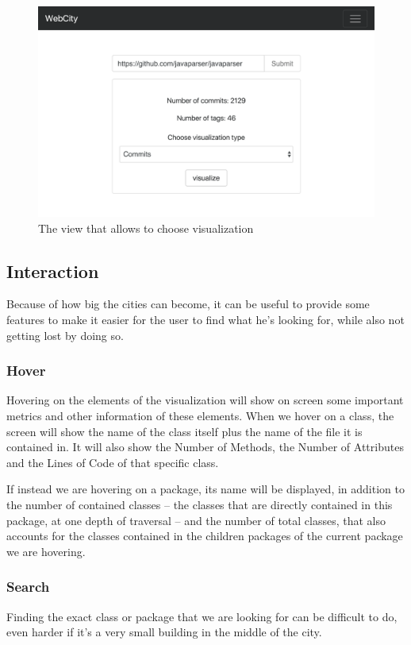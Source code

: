 \documentclass[]{usiinfbachelorproject}
\begin{document}
\begin{figure}[H]
    \centering
  \includegraphics[width=.6\textwidth]{pictures/interface2.png}
  \caption{The view that allows to choose visualization}
  \label{fig:interface2}
\end{figure}

\subsection{Interaction} \label{Interaction}
Because of how big the cities can become, it can be useful to provide some features to make it easier for the user to find what he's looking for, while also not getting lost by doing so.

\subsubsection{Hover} \label{Hover}
Hovering on the elements of the visualization will show on screen some important metrics and other information of these elements.
When we hover on a class, the screen will show the name of the class itself plus the name of the file it is contained in. It will also show the Number of Methods,
 the Number of Attributes and the Lines of Code of that specific class.

 If instead we are hovering on a package, its name will be displayed, in addition to the number of contained classes -- the classes that are directly contained in this package, at one depth of traversal --
  and the number of total classes, that also accounts for the classes contained in the children packages of the current package we are hovering.

\subsubsection{Search} \label{Search}
Finding the exact class or package that we are looking for can be difficult to do, even harder if it's a very small building in the middle of the city.
\end{document}
